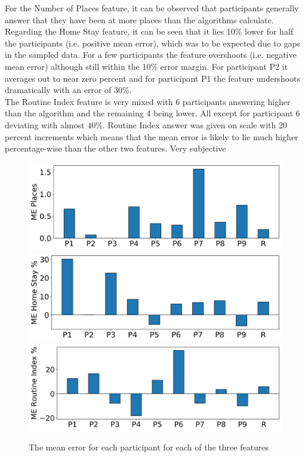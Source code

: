 For the Number of Places feature, it can be observed that participants generally answer that they have been at more places than the algorithms calculate.\\

Regarding the Home Stay feature, it can be seen that it lies 10\% lower for half the participants (i.e. positive mean error), which was to be expected due to gaps in the sampled data. For a few participants the feature overshoots (i.e. negative mean error) although still within the 10\% error margin. For participant P2 it averages out to near zero percent and for participant P1 the feature undershoots dramatically with an error of 30\%.\\

The Routine Index feature is very mixed with 6 participants answering higher than the algorithm and the remaining 4 being lower. All except for participant 6 deviating with almost 40\%. Routine Index answer was given on scale with 20 percent increments which means that the mean error is likely to lie much higher percentage-wise than the other two features.
Very subjective\\


\begin{figure}[h]
    \centering
    \includegraphics[width=\textwidth]{images/study/me_places.png}
    \includegraphics[width=\textwidth]{images/study/me_homestay.png}
    \includegraphics[width=\textwidth]{images/study/me_routine.png}
    \caption{The mean error for each participant for each of the three features}
    \label{fig:plot-mean-error}
\end{figure}


